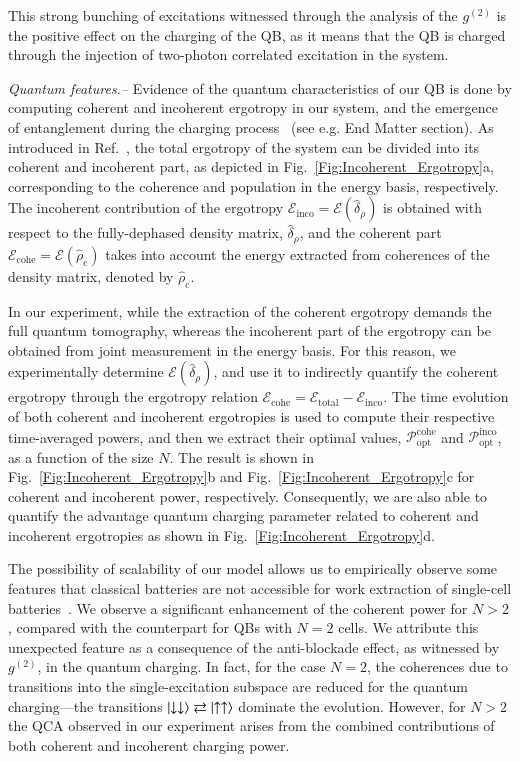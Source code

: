 \documentclass[aps,prl,epsfigure,twocolumn,superscriptaddress]{revtex4-2}
\newcommand{\Ecal}{\mathcal{E}}
\newcommand{\Pcal}{\mathcal{P}}
\newcommand{\1}{\mathbbm{1}}
\newcommand{\SubFig}[2]{\ref{#1}{\color{blue}#2}}
\newcommand{\RefB}[1]{{\color{black}#1}}
\newcommand{\RefC}[1]{{\color{black}#1}}
\begin{document}
	This strong bunching of excitations witnessed through the analysis of the $g^{(2)}$ is the positive effect on the charging of the QB, as it means that the QB is charged through the injection of two-photon correlated excitation in the system.

	\RefB{\emph{Quantum features.--}} \RefB{Evidence of the quantum characteristics of our QB is done by computing coherent and incoherent ergotropy in our system, and the emergence of entanglement during the charging process~\cite{Francica:20,Shi:22} (see e.g. End Matter section).} As introduced in Ref.~\cite{Francica:20}, the total ergotropy of the system can be divided into its coherent and incoherent part, as depicted in Fig.~\SubFig{Fig:Incoherent_Ergotropy}{a}, corresponding to the coherence and population in the energy basis, respectively. The incoherent contribution of the ergotropy $\Ecal_{\mathrm{inco}} = \Ecal(\hat{\delta}_{\rho})$ is obtained with respect to the fully-dephased density matrix, $\hat{\delta}_{\rho}$, and the coherent part $\Ecal_{\mathrm{cohe}} = \Ecal(\hat{\rho}_{\mathrm{c}})$ takes into account the energy extracted from coherences of the density matrix, denoted by $\hat{\rho}_{\mathrm{c}}$.

	In our experiment, while the extraction of the coherent ergotropy demands the full quantum tomography, whereas the incoherent part of the ergotropy can be obtained from joint measurement in the  energy basis. For this reason, we experimentally determine $\Ecal(\hat{\delta}_{\rho})$, and use it to indirectly quantify the coherent ergotropy through the ergotropy relation $\Ecal_{\mathrm{cohe}} = \Ecal_{\mathrm{total}} - \Ecal_{\mathrm{inco}}$. The time evolution of both coherent and incoherent ergotropies is used to compute their respective time-averaged powers, and then we extract their optimal values, $\Pcal^{\mathrm{cohe}}_{\mathrm{opt}}$ and $\Pcal^{\mathrm{inco}}_{\mathrm{opt}}$, as a function of the size $N$. The result is shown in Fig.~\SubFig{Fig:Incoherent_Ergotropy}{b} and Fig.~\SubFig{Fig:Incoherent_Ergotropy}{c} for coherent and incoherent power, respectively. Consequently, we are also able to quantify the advantage quantum charging parameter related to coherent and incoherent ergotropies as shown in Fig.~\SubFig{Fig:Incoherent_Ergotropy}{d}.

	The possibility of scalability of our model allows us to empirically observe some features that classical batteries are not accessible for work extraction of single-cell batteries~\cite{Alexia:20,Niu:24}. We observe a significant enhancement of the coherent power for $N>2$, compared with the counterpart for QBs with $N=2$ cells. We attribute this unexpected feature as a consequence of the anti-blockade effect, as witnessed by $g^{(2)}$, in the quantum charging. In fact, for the case $N=2$, the coherences due to transitions into the single-excitation subspace are reduced for the quantum charging---the transitions $\ket{\downarrow\downarrow} \rightleftarrows \ket{\uparrow\uparrow}$ dominate the evolution. However, for $N > 2$ \RefC{the QCA} observed in our experiment arises from the combined contributions of both coherent and incoherent charging power.
\end{document}
